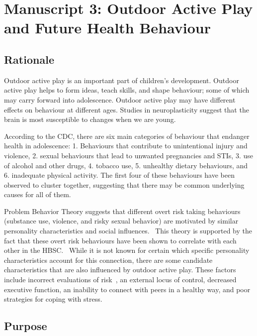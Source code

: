 \documentclass [11pt]{article}
\begin{document}
\section{Manuscript 3: Outdoor Active Play and Future Health Behaviour}

\subsection{Rationale} 

Outdoor active play is an important part of children's development. Outdoor active play helps to form ideas, teach skills, and shape behaviour; some of which may carry forward into adolescence. Outdoor active play may have different effects on behaviour at different ages. Studies in neuroplasticity suggest that the brain is most susceptible to changes when we are young.~\cite{Mundkur2005-ws} 

According to the CDC, there are six main categories of behaviour that endanger health in adolescence: 1. Behaviours that contribute to unintentional injury and violence, 2. sexual behaviours that lead to unwanted pregnancies and STIs, 3. use of alcohol and other drugs, 4. tobacco use, 5. unhealthy dietary behaviours, and 6. inadequate physical activity.  The first four of these behaviours have been observed to cluster together, suggesting that there may be common underlying causes for all of them.~\cite{Kwong2017-oe,Noble2015-yd} 

Problem Behavior Theory \cite{Jessor1987-wz} suggests that different overt risk taking behaviours (substance use, violence, and risky sexual behavior) are motivated by similar personality characteristics and social influences.~\cite{Mobley2013-ij} This theory is supported by the fact that these overt risk behaviours have been shown to correlate with each other in the HBSC.~\cite{Kwong2017-oe} While it is not known for certain which specific personality characteristics account for this connection, there are some candidate characteristics that are also influenced by outdoor active play. These factors include incorrect evaluations of risk~\cite{Couch2017-tb}, an external locus of control, decreased executive function, an inability to connect with peers in a healthy way, and poor strategies for coping with stress.~\cite{Unger2016-qm,Johnson2002-qf,barker2014less} 

\subsection{Purpose}
\end{document}
